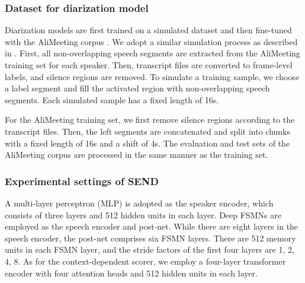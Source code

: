 \documentclass[a4paper]{article}
\begin{document}
\linespread{1.1}
\begin{table}[t!]
	\caption{The performance of speaker embedding model.}
	\label{tab:eer}
	\centering
	\vspace{-0.4cm}
\end{table}
\subsubsection{Dataset for diarization model}
Diarization models are first trained on a simulated dataset and then fine-tuned with the AliMeeting corpus \cite{FanYu2022}.
We adopt a similar simulation process as described in \cite{Weiqing2022}. First, all non-overlapping speech segments are extracted from the AliMeeting training set for each speaker.
Then, transcript files are converted to frame-level labels, and silence regions are removed.
To simulate a training sample, we choose a label segment and fill the activated region with non-overlapping speech segments. Each simulated sample has a fixed length of 16s.

For the AliMeeting training set, we first remove silence regions according to the transcript files. Then, the left segments are concatenated and split into chunks with a fixed length of 16s and a shift of 4s. The evaluation and test sets of the AliMeeting corpus are processed in the same manner as the training set.
\subsubsection{Experimental settings of SEND}
A multi-layer perceptron (MLP) is adopted as the speaker encoder, which consists of three layers and 512 hidden units in each layer.
Deep FSMNs are employed as the speech encoder and post-net.
While there are eight layers in the speech encoder, the post-net comprises six FSMN layers.
There are 512 memory units in each FSMN layer, and the stride factors of the first four layers are 1, 2, 4, 8.
As for the context-dependent scorer, we employ a four-layer transformer encoder with four attention heads and 512 hidden units in each layer.
\end{document}
